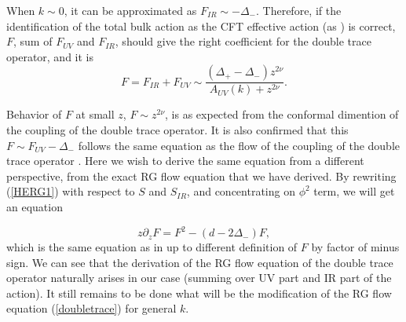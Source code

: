 \documentclass[12pt,epsbox]{article}
\numberwithin{equation}{section}
\begin{document}
When $k \sim 0$, it can be approximated as $F_{IR} \sim -\Delta_-$.
Therefore, if the identification of the total bulk action as the CFT effective action (as \cite{dVV}) is correct, $F$, sum of $F_{UV}$ and $F_{IR}$, should give the right coefficient for the double trace operator, and it is
\begin{equation}
F= F_{IR}+ F_{UV} \sim \frac{(\Delta_+-\Delta_-)z^{2\nu}}{A_{UV}(k)+z^{2\nu}}.
\end{equation}

 Behavior of $F$ at small $z$, $F \sim z^{2\nu}$, is as expected from the conformal dimention of the coupling of the double trace operator. It is also confirmed that this $F \sim F_{UV}-\Delta_-$ follows the same equation as the flow of the coupling of the double trace operator \cite{MukundHRG}. Here we wish to derive the same equation from a different perspective, from the exact RG flow equation that we have derived.
By rewriting (\ref{HERG1}) with respect to $S$ and $S_{IR}$, and concentrating on $\phi^2$ term, we will get an equation

\begin{equation}
z\partial_z F = F^2 -(d-2\Delta_-)F,\label{doubletrace}
\end{equation}
which is the same equation as in \cite{MukundHRG} up to different definition of $F$ by factor of minus sign. We can see that the derivation of the RG flow equation of the double trace operator naturally arises in our case (summing over UV part and IR part of the action). It still remains to be done what will be the modification of the RG flow equation (\ref{doubletrace}) for general $k$.
\end{document}
